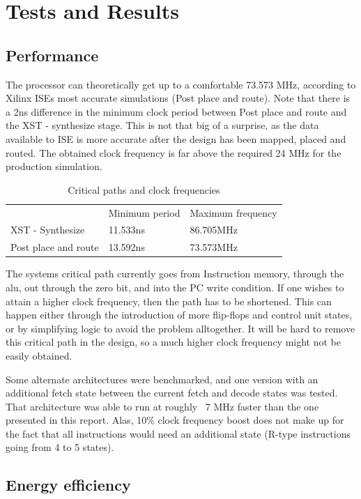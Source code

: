 \section{Tests and Results}

\subsection{Performance}

The processor can theoretically get up to a comfortable 73.573 MHz, according to Xilinx ISEs most accurate simulations (Post place and route).
Note that there is a 2ns difference in the minimum clock period between Post place and route and the XST - synthesize stage.
This is not that big of a surprise, as the data available to ISE is more accurate after the design has been mapped, placed and routed.
The obtained clock frequency is far above the required 24 MHz for the production simulation.

\begin{table}[h]
  \centering
  \begin{tabular}{lll}
    & Minimum period & Maximum frequency \\
    XST - Synthesize & 11.533ns &  86.705MHz \\
    Post place and route & 13.592ns &  73.573MHz \\
  \end{tabular}
  \caption{Critical paths and clock frequencies}
\end{table}

The systems critical path currently goes from Instruction memory, through the alu, out through the zero bit, and into the PC write condition.
If one wishes to attain a higher clock frequency, then the path has to be shortened.
This can happen either through the introduction of more flip-flops and control unit states, or by simplifying logic to avoid the problem alltogether.
It will be hard to remove this critical path in the design, so a much higher clock frequency might not be easily obtained.

Some alternate architectures were benchmarked, and one version with an additional fetch state between the current fetch and decode states was tested.
That architecture was able to run at roughly ~7 MHz faster than the one presented in this report.
Alas, 10\% clock frequency boost does not make up for the fact that all instructions would need an additional state (R-type instructions going from 4 to 5 states).

\subsection{Energy efficiency}


